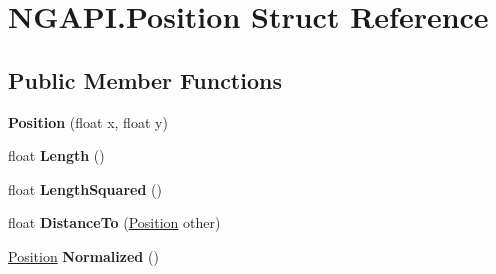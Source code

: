 \hypertarget{struct_n_g_a_p_i_1_1_position}{}\section{N\+G\+A\+P\+I.\+Position Struct Reference}
\label{struct_n_g_a_p_i_1_1_position}
\subsection*{Public Member Functions}
\begin{DoxyCompactItemize}
\item 
\mbox{\label{struct_n_g_a_p_i_1_1_position_aad6471c67ca9261b859a531a3961028f}} 
{\bfseries Position} (float x, float y)
\item 
\mbox{\label{struct_n_g_a_p_i_1_1_position_aafb5bfb824407641424d2d3cee166050}} 
float {\bfseries Length} ()
\item 
\mbox{\label{struct_n_g_a_p_i_1_1_position_a9c08b83f87fe6c04de25205adf203d45}} 
float {\bfseries Length\+Squared} ()
\item 
\mbox{\label{struct_n_g_a_p_i_1_1_position_a73c7933a73507b061f8d1f8d79a306e3}} 
float {\bfseries Distance\+To} (\hyperlink{struct_n_g_a_p_i_1_1_position}{Position} other)
\item 
\mbox{\label{struct_n_g_a_p_i_1_1_position_a18073ea71dee769b2666971e069193de}} 
\hyperlink{struct_n_g_a_p_i_1_1_position}{Position} {\bfseries Normalized} ()
\end{DoxyCompactItemize}
